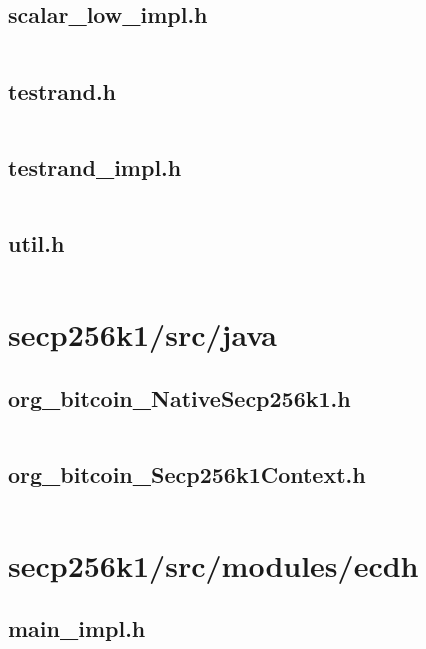 \documentclass{article}
\begin{document}
\subsection{scalar\_low\_impl.h}
\inputminted{cpp}{/home/dufferzafar/dev/@clones/bitcoin/src/secp256k1/src/scalar_low_impl.h}
\newpage

\subsection{testrand.h}
\inputminted{cpp}{/home/dufferzafar/dev/@clones/bitcoin/src/secp256k1/src/testrand.h}
\newpage

\subsection{testrand\_impl.h}
\inputminted{cpp}{/home/dufferzafar/dev/@clones/bitcoin/src/secp256k1/src/testrand_impl.h}
\newpage

\subsection{util.h}
\inputminted{cpp}{/home/dufferzafar/dev/@clones/bitcoin/src/secp256k1/src/util.h}
\newpage

\section{secp256k1/src/java}

\subsection{org\_bitcoin\_NativeSecp256k1.h}
\inputminted{cpp}{/home/dufferzafar/dev/@clones/bitcoin/src/secp256k1/src/java/org_bitcoin_NativeSecp256k1.h}
\newpage

\subsection{org\_bitcoin\_Secp256k1Context.h}
\inputminted{cpp}{/home/dufferzafar/dev/@clones/bitcoin/src/secp256k1/src/java/org_bitcoin_Secp256k1Context.h}
\newpage

\section{secp256k1/src/modules/ecdh}

\subsection{main\_impl.h}
\inputminted{cpp}{/home/dufferzafar/dev/@clones/bitcoin/src/secp256k1/src/modules/ecdh/main_impl.h}
\newpage
\end{document}
